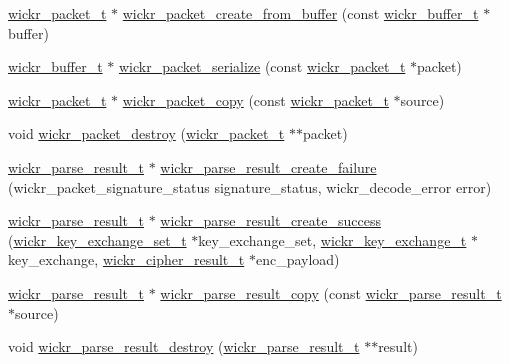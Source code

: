 \begin{DoxyCompactItemize}
\mbox{\hyperlink{structwickr__packet}{wickr\+\_\+packet\+\_\+t}} $\ast$ \mbox{\hyperlink{group__wickr__protocol_ga3427a40815c9f65a78516405d1b88072}{wickr\+\_\+packet\+\_\+create\+\_\+from\+\_\+buffer}} (const \mbox{\hyperlink{structwickr__buffer}{wickr\+\_\+buffer\+\_\+t}} $\ast$buffer)
\item 
\mbox{\hyperlink{structwickr__buffer}{wickr\+\_\+buffer\+\_\+t}} $\ast$ \mbox{\hyperlink{group__wickr__protocol_gaa983fe863635b69d69d6d86d01443ecf}{wickr\+\_\+packet\+\_\+serialize}} (const \mbox{\hyperlink{structwickr__packet}{wickr\+\_\+packet\+\_\+t}} $\ast$packet)
\item 
\mbox{\hyperlink{structwickr__packet}{wickr\+\_\+packet\+\_\+t}} $\ast$ \mbox{\hyperlink{group__wickr__protocol_ga0c95ad86819bacf98c11115d748039db}{wickr\+\_\+packet\+\_\+copy}} (const \mbox{\hyperlink{structwickr__packet}{wickr\+\_\+packet\+\_\+t}} $\ast$source)
\item 
void \mbox{\hyperlink{group__wickr__protocol_gab15d7556ad2806aa823ec2d3e3bf5a46}{wickr\+\_\+packet\+\_\+destroy}} (\mbox{\hyperlink{structwickr__packet}{wickr\+\_\+packet\+\_\+t}} $\ast$$\ast$packet)
\item 
\mbox{\hyperlink{structwickr__parse__result}{wickr\+\_\+parse\+\_\+result\+\_\+t}} $\ast$ \mbox{\hyperlink{group__wickr__protocol_gac2673bcfeae2f8d693e523809bb6bb30}{wickr\+\_\+parse\+\_\+result\+\_\+create\+\_\+failure}} (wickr\+\_\+packet\+\_\+signature\+\_\+status signature\+\_\+status, wickr\+\_\+decode\+\_\+error error)
\item 
\mbox{\hyperlink{structwickr__parse__result}{wickr\+\_\+parse\+\_\+result\+\_\+t}} $\ast$ \mbox{\hyperlink{group__wickr__protocol_ga7bd98225a92620e1aa5940cf59fdbedf}{wickr\+\_\+parse\+\_\+result\+\_\+create\+\_\+success}} (\mbox{\hyperlink{structwickr__key__exchange__set}{wickr\+\_\+key\+\_\+exchange\+\_\+set\+\_\+t}} $\ast$key\+\_\+exchange\+\_\+set, \mbox{\hyperlink{structwickr__key__exchange}{wickr\+\_\+key\+\_\+exchange\+\_\+t}} $\ast$key\+\_\+exchange, \mbox{\hyperlink{structwickr__cipher__result}{wickr\+\_\+cipher\+\_\+result\+\_\+t}} $\ast$enc\+\_\+payload)
\item 
\mbox{\hyperlink{structwickr__parse__result}{wickr\+\_\+parse\+\_\+result\+\_\+t}} $\ast$ \mbox{\hyperlink{group__wickr__protocol_ga1671066ddc19b38ed05d4460d5a96706}{wickr\+\_\+parse\+\_\+result\+\_\+copy}} (const \mbox{\hyperlink{structwickr__parse__result}{wickr\+\_\+parse\+\_\+result\+\_\+t}} $\ast$source)
\item 
void \mbox{\hyperlink{group__wickr__protocol_ga706d39419c8991f417f37f556cee8df9}{wickr\+\_\+parse\+\_\+result\+\_\+destroy}} (\mbox{\hyperlink{structwickr__parse__result}{wickr\+\_\+parse\+\_\+result\+\_\+t}} $\ast$$\ast$result)

\end{DoxyCompactItemize}
